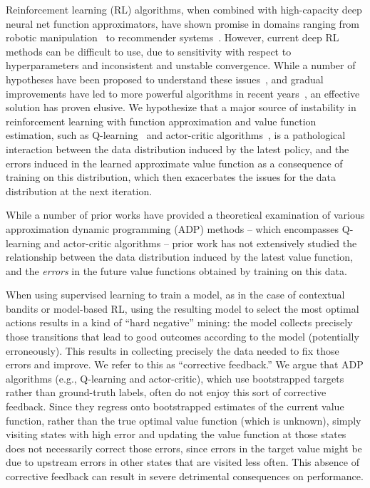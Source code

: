 \documentclass[jmlr]{article}
\begin{document}
Reinforcement learning (RL) algorithms, when combined with high-capacity deep neural net function approximators, have shown promise in domains ranging from robotic manipulation~\citep{kalashnikov18} to recommender systems~\citep{shani2005recommender}. However, current deep RL methods can be difficult to use, due to sensitivity with respect to hyperparameters and inconsistent and unstable convergence. While a number of hypotheses have been proposed to understand these issues~\citep{hassalt10doubleq,Hasselt2018DeepRL,pmlr-v80-fujimoto18a,fu19diagnosing}, and gradual improvements have led to more powerful algorithms in recent years~\citep{Haarnoja18,rainbow}, an effective solution has proven elusive. We hypothesize that a major source of instability in reinforcement learning with function approximation and value function estimation, such as Q-learning~\citep{Watkins92,Riedmiller2005,Mnih2015} and actor-critic algorithms~\citep{Haarnoja2017,konda_ac}, is a pathological interaction between the data distribution induced by the latest policy, and the errors induced in the learned approximate value function as a consequence of training on this distribution, which then exacerbates the issues for the data distribution at the next iteration.


While a number of prior works have provided a theoretical examination of various approximation dynamic programming (ADP) methods -- which encompasses Q-learning and actor-critic algorithms --
prior work has not extensively studied the relationship between the data distribution induced by the latest value function, and the \textit{errors} in the future value functions obtained by training on this data.

When using supervised learning to train a model, as in the case of contextual bandits or model-based RL, using the resulting model to select the most optimal actions results in a kind of ``hard negative'' mining: the model collects precisely those transitions that lead to good outcomes according to the model (potentially erroneously). This results in collecting precisely the data needed to fix those errors and improve. We refer to this as ``corrective feedback.''
We argue that ADP algorithms (e.g., Q-learning and actor-critic), which use bootstrapped targets rather than ground-truth labels, often do not enjoy this sort of corrective feedback. Since they regress onto bootstrapped estimates of the current value function, rather than the true optimal value function (which is unknown), simply visiting states with high error and updating the value function at those states does not necessarily correct those errors, since errors in the target value might be due to upstream errors in other states that are visited less often. This absence of corrective feedback can result in severe detrimental consequences on performance.
\end{document}
